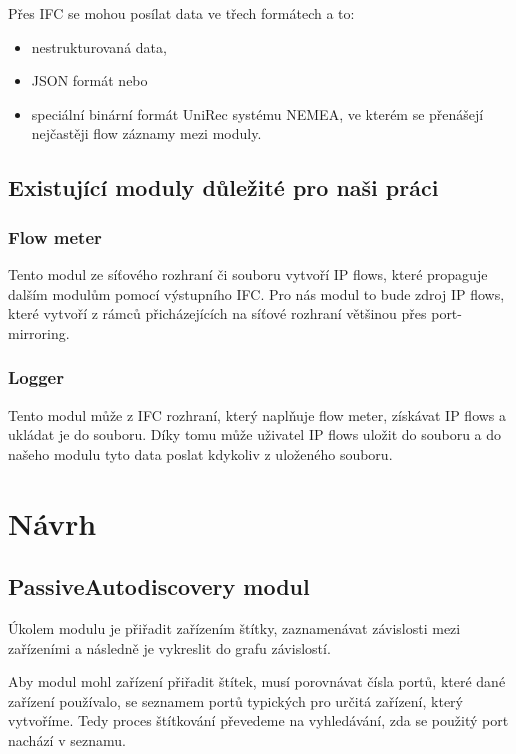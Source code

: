\documentclass[thesis=B,czech,hidelinks]{FITthesis}[2019/03/21]
\begin{document}
    Přes IFC se mohou posílat data ve třech formátech a to:
    \begin{itemize}
        \item nestrukturovaná data,
        \item JSON formát nebo
        \item speciální binární formát UniRec systému NEMEA, ve kterém se přenášejí nejčastěji flow záznamy mezi moduly.
    \end{itemize}
    
    \section{Existující moduly důležité pro naši práci}
    
    \subsection{Flow meter}
    Tento modul ze síťového rozhraní či souboru vytvoří IP flows, které propaguje dalším modulům pomocí výstupního IFC. Pro nás modul to bude zdroj IP flows, které vytvoří z rámců přicházejících na síťové rozhraní většinou přes port-mirroring.
    
    \subsection{Logger}
    Tento modul může z IFC rozhraní, který naplňuje flow meter, získávat IP flows a ukládat je do souboru. Díky tomu může uživatel IP flows uložit do souboru a do našeho modulu tyto data poslat kdykoliv z uloženého souboru.
\chapter{Návrh}
    \section{PassiveAutodiscovery modul}
    Úkolem modulu je přiřadit zařízením štítky, zaznamenávat závislosti mezi zařízeními a následně je vykreslit do grafu závislostí.
    
    Aby modul mohl zařízení přiřadit štítek, musí porovnávat čísla portů, které dané zařízení používalo, se seznamem portů typických pro určitá zařízení, který vytvoříme. Tedy proces štítkování převedeme na vyhledávání, zda se použitý port nachází v seznamu.
    
\end{document}
